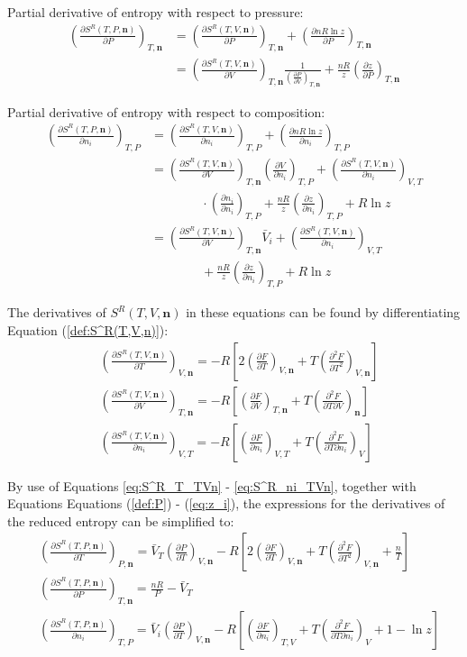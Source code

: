 \documentclass[internal,english]{sintefmemo2012}
\numberwithin{equation}{section}
\newcommand*{\pder}[2]{\left(\frac{\partial #1}{\partial #2}\right)}
\newcommand*{\pdder}[2]{\left(\frac{\partial^2 #1}{\partial #2^2}\right)}
\newcommand*{\pdcross}[3]{\left(\frac{\partial^2 #1}{\partial #2 \partial #3}\right)}
\newcommand*{\reff}[1]{(\ref{#1})}
\begin{document}
Partial derivative of entropy with respect to pressure:
\begin{equation}
\begin{split}
\left( \frac{\partial S^R(T,P,\textbf{n})}{\partial P} \right)_{T,\textbf{n}}
& = \left( \frac{\partial S^R(T,V, \textbf{n})}{\partial P} \right)_{T,\textbf{n}} + \left( \frac{\partial nR \ln z}{\partial P} \right)_{T,\textbf{n}} \\
& = \pder{S^R(T,V,\textbf{n})}{V}_{T,\textbf{n}} \frac{1}{\pder{P}{V}_{T,\textbf{n}}} + \frac{nR}{z} \pder{z}{P}_{T,\textbf{n}}
\end{split}
\end{equation}

Partial derivative of entropy with respect to composition:
\begin{equation}
\begin{split}
\left( \frac{\partial S^R(T,P,\textbf{n})}{\partial n_i} \right)_{T,P}
& = \left( \frac{\partial S^R(T,V, \textbf{n})}{\partial n_i} \right)_{T,P} + \left( \frac{\partial nR \ln z}{\partial n_i} \right)_{T,P} \\
& = \pder{S^R(T,V,\textbf{n})}{V}_{T,\textbf{n}} \pder{V}{n_i}_{T,P} + \pder{S^R(T,V,\textbf{n})}{n_i}_{V,T} \\
& \qquad \qquad \cdot \pder{n_i}{n_i}_{T,P} + \frac{nR}{z} \pder{z}{n_i}_{T,P} + R \ln z\\
& = \pder{S^R(T,V,\textbf{n})}{V}_{T,\textbf{n}} \bar{V}_i + \pder{S^R(T,V,\textbf{n})}{n_i}_{V,T} \\
& \qquad \qquad  + \frac{nR}{z} \pder{z}{n_i}_{T,P} + R \ln z
\end{split}
\end{equation}

The derivatives of $S^R(T,V,\textbf{n})$ in these equations can be found by differentiating Equation \reff{def:S^R(T,V,n)}:
\begin{align}
\label{eq:S^R_T_TVn}
& \pder{S^R(T,V,\textbf{n})}{T}_{V,\textbf{n}} = -R \left[2 \pder{F}{T}_{V,\textbf{n}} + T\pdder{F}{T}_{V,\textbf{n}} \right] \\
& \pder{S^R(T,V,\textbf{n})}{V}_{T,\textbf{n}} = -R \left[\pder{F}{V}_{T,\textbf{n}} + T \pdcross{F}{T}{V}_\textbf{n} \right] \\ 
\label{eq:S^R_ni_TVn}
& \pder{S^R(T,V,\textbf{n})}{n_i}_{V,T} = -R \left[\pder{F}{n_i}_{V,T} + T \pdcross{F}{T}{n_i}_V \right]
\end{align}
 
By use of Equations \ref{eq:S^R_T_TVn} - \ref{eq:S^R_ni_TVn}, together with Equations Equations \reff{def:P} - \reff{eq:z_i}, the expressions for the derivatives of the reduced entropy can be simplified to:
\begin{align}
& \pder{S^R(T,P,\textbf{n})}{T}_{P,\textbf{n}} = \bar{V}_T \pder{P}{T}_{V,\textbf{n}} - R \left[2\pder{F}{T}_{V,\textbf{n}} + T \pdder{F}{T}_{V,\textbf{n}} + \frac{n}{T} \right] \\
& \pder{S^R(T,P,\textbf{n})}{P}_{T,\textbf{n}} = \frac{nR}{P} - \bar{V}_T \\
& \pder{S^R(T,P,\textbf{n})}{n_i}_{T,P} = \bar{V}_i \pder{P}{T}_{V,\textbf{n}} - R\left[ \pder{F}{n_i}_{T,V} + T\pdcross{F}{T}{n_i}_V + 1 - \ln z \right] 
\end{align}
\end{document}
